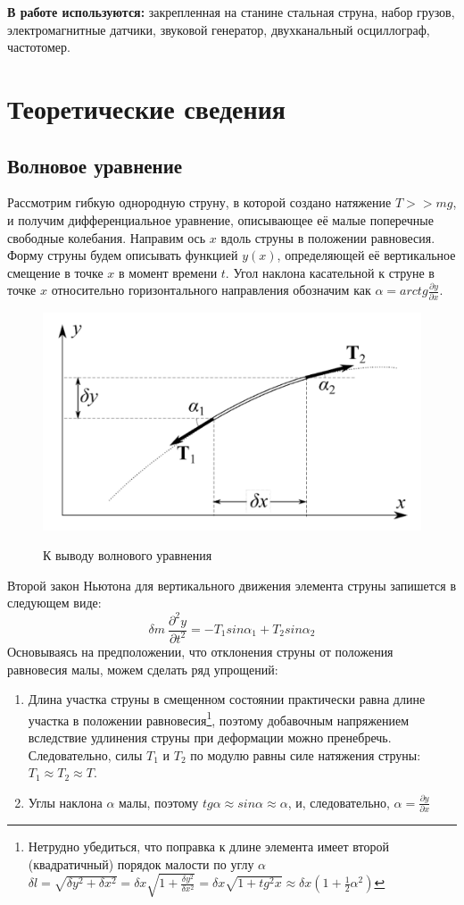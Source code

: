 \documentclass[a4paper, 12pt]{article}
\begin{document}
{\bfseries В работе используются:} закрепленная на станине стальная струна, набор грузов, электромагнитные датчики, звуковой генератор, двухканальный осциллограф,
частотомер.

\section{Теоретические сведения}
\subsection{Волновое уравнение}
Рассмотрим гибкую однородную струну, в которой создано натяжение \(T >>mg\), и получим дифференциальное уравнение, описывающее её малые поперечные свободные колебания. Направим ось \(x\) вдоль струны в положении равновесия. Форму струны будем описывать функцией \(y(x)\), определяющей её вертикальное смещение в точке \(x\) в момент времени \(t\). Угол наклона касательной к струне в точке \(x\) относительно горизонтального направления обозначим как \(\alpha = arctg\frac{\partial y}{\partial x}\).
\begin{figure}[h!]
    \centering
    \includegraphics[scale=0.5]{string_equation.png}
    \label{1}
    \caption{К выводу волнового уравнения}
\end{figure}

Второй закон Ньютона для вертикального движения элемента струны запишется в следующем виде:
\[\delta m \ \frac{\partial^2y}{\partial t^2} = -T_1sin\alpha_1 + T_2sin\alpha_2\]
Основываясь на предположении, что отклонения струны от положения равновесия малы, можем сделать ряд упрощений:
\begin{enumerate}
    \item Длина участка струны в смещенном состоянии практически равна длине участка в положении равновесия\footnote{Нетрудно убедиться, что поправка к длине элемента имеет второй (квадратичный) порядок малости по углу \(\alpha\) \(\delta l = \sqrt{\delta y^2 + \delta x^2} = \delta x \sqrt{1+ \frac{\delta y^2}{\delta x^2}} = \delta x \sqrt{1+ tg^2x} \approx \delta x (1+\frac{1}{2}\alpha^2)\)}, поэтому добавочным напряжением вследствие удлинения струны при деформации можно пренебречь. Следовательно, силы \(T_1\) и \(T_2\) по модулю равны силе натяжения струны: \(T_1 \approx T_2 \approx T\).
    \item Углы наклона \(\alpha\) малы, поэтому \(tg \alpha \approx sin \alpha \approx \alpha\), и, следовательно, \(\alpha = \frac{\partial y}{\partial x}\)
\end{enumerate}
\end{document}
